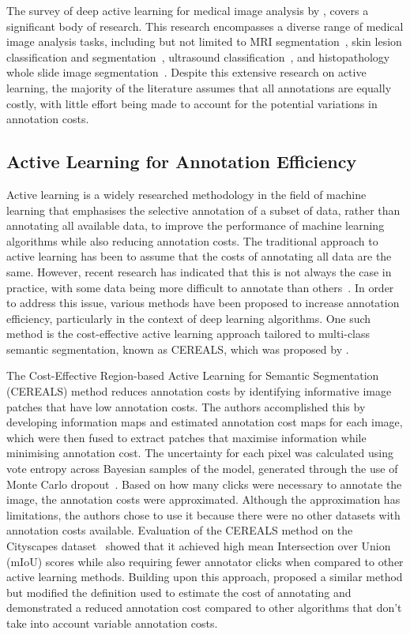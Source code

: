 The survey of deep active learning for medical image analysis by \cite{budd2021survey}, covers a significant body of research. This research encompasses a diverse range of medical image analysis tasks, including but not limited to MRI segmentation~\citep{konyushkova2019geometry,zhao2019data}, skin lesion classification and segmentation~\citep{shi2019active, gorriz2017cost}, ultrasound classification~\cite{liu2020semi}, and histopathology whole slide image segmentation~\citep{folmsbee2021whole, jin2021reducing}. Despite this extensive research on active learning, the majority of the literature assumes that all annotations are equally costly, with little effort being made to account for the potential variations in annotation costs.

\subsection{Active Learning for Annotation Efficiency}
\label{subsec:active_annotation_efficiency}
Active learning is a widely researched methodology in the field of machine learning that emphasises the selective annotation of a subset of data, rather than annotating all available data, to improve the performance of machine learning algorithms while also reducing annotation costs. The traditional approach to active learning has been to assume that the costs of annotating all data are the same. However, recent research has indicated that this is not always the case in practice, with some data being more difficult to annotate than others~\citep{settles2008active}. In order to address this issue, various methods have been proposed to increase annotation efficiency, particularly in the context of deep learning algorithms. One such method is the cost-effective active learning approach tailored to multi-class semantic segmentation, known as CEREALS, which was proposed by \cite{mackowiak2018cereals}.

The Cost-Effective Region-based Active Learning for Semantic Segmentation (CEREALS) method reduces annotation costs by identifying informative image patches that have low annotation costs. The authors accomplished this by developing information maps and estimated annotation cost maps for each image, which were then fused to extract patches that maximise information while minimising annotation cost. The uncertainty for each pixel was calculated using vote entropy across Bayesian samples of the model, generated through the use of Monte Carlo dropout~\citep{gal2016dropout}. Based on how many clicks were necessary to annotate the image, the annotation costs were approximated. Although the approximation has limitations, the authors chose to use it because there were no other datasets with annotation costs available. Evaluation of the CEREALS method on the Cityscapes dataset~\citep{cordts2016cityscapes} showed that it achieved high mean Intersection over Union (mIoU) scores while also requiring fewer annotator clicks when compared to other active learning methods. Building upon this approach, \cite{colling2020metabox+} proposed a similar method but modified the definition used to estimate the cost of annotating and demonstrated a reduced annotation cost compared to other algorithms that don’t take into account variable annotation costs.


